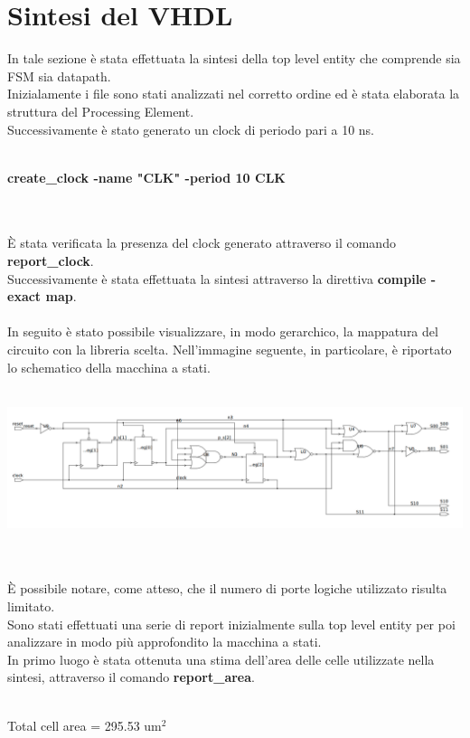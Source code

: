 \documentclass[11pt,  english, makeidx, a4paper, titlepage, oneside]{book}
\begin{document}
\section{Sintesi del VHDL} 
In tale sezione è stata effettuata la sintesi della top level entity che comprende sia FSM sia datapath.
\\
Inizialamente i file sono stati analizzati nel corretto ordine ed è stata elaborata la struttura del Processing Element.
\\
Successivamente è stato generato un clock di periodo pari a 10 ns.
\\\\
\centerline{\textbf{create\_clock -name "CLK" -period 10 {CLK}} }
\\\\
È stata verificata la presenza del clock generato attraverso il comando \textbf{report\_clock}.
\\
Successivamente è stata effettuata la sintesi attraverso la direttiva \textbf{compile -exact map}.
\\\\
In seguito è stato possibile visualizzare, in modo gerarchico, la mappatura del circuito con la libreria scelta. Nell'immagine seguente, in particolare, è riportato lo schematico della macchina a stati.
\\\\
\centerline{\includegraphics[width=15cm]{./img/Lab_2/FSM_Schematic.png}}
\\\\ 
È possibile notare, come atteso, che il numero di porte logiche utilizzato risulta limitato.
\\
Sono stati effettuati una serie di report inizialmente sulla top level entity per poi analizzare in modo più approfondito la macchina a stati.
\\
In primo luogo è stata ottenuta una stima dell'area delle celle utilizzate nella sintesi, attraverso il comando \textbf{report\_area}.
\\\\
\centerline{Total cell area = 295.53 um$^2$}
\\\\
\end{document}
